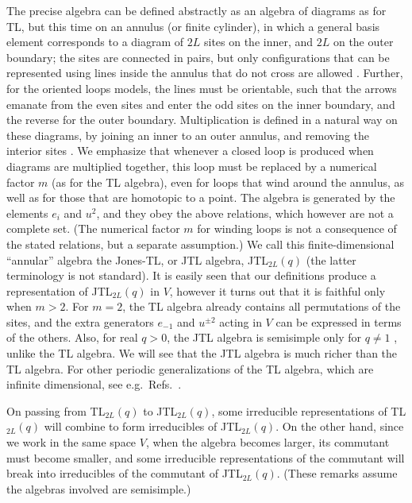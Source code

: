 \documentclass[twocolumn,floats,pra]{revtex4}
\begin{document}
The precise algebra can be defined abstractly as an algebra of
diagrams as for TL, but this time on an annulus (or finite
cylinder), in which a general basis element corresponds to a
diagram of $2L$ sites on the inner, and $2L$ on the outer
boundary; the sites are connected in pairs, but only
configurations that can be represented using lines inside the
annulus that do not cross are allowed \cite{jones2}. Further, for
the oriented loops models, the lines must be orientable, such that
the arrows emanate from the even sites and enter the odd sites on
the inner boundary, and the reverse for the outer boundary.
Multiplication is defined in a natural way on these diagrams, by
joining an inner to an outer annulus, and removing the interior
sites \cite{jones2}. We emphasize that whenever a closed loop is
produced when diagrams are multiplied together, this loop must be
replaced by a numerical factor $m$ (as for the TL algebra), even
for loops that wind around the annulus, as well as for those that
are homotopic to a point. The algebra is generated by the elements
$e_i$ and $u^2$, and they obey the above relations, which however
are not a complete set. (The numerical factor $m$ for winding
loops is not a consequence of the stated relations, but a separate
assumption.) We call this finite-dimensional ``annular'' algebra
\cite{jones2} the Jones-TL, or JTL algebra, JTL$_{2L}(q)$
\cite{jones2,eg} (the latter terminology is not standard). It is
easily seen that our definitions produce a representation of
JTL$_{2L}(q)$ in $V$, however it turns out that it is faithful
only when $m>2$. For $m=2$, the TL algebra already contains all
permutations of the sites, and the extra generators $e_{-1}$ and
$u^{\pm 2}$ acting in $V$ can be expressed in terms of the others.
Also, for real $q>0$, the JTL algebra is semisimple only for
$q\neq 1$ \cite{jones2}, unlike the TL algebra. We will see that
the JTL algebra is much richer than the TL algebra. For other
periodic generalizations of the TL algebra, which are infinite
dimensional, see e.g.\ Refs.\ \cite{ms1,ms2}.

On passing from TL$_{2L}(q)$ to JTL$_{2L}(q)$, some irreducible
representations of TL$_{2L}(q)$ will combine to form irreducibles
of JTL$_{2L}(q)$. On the other hand, since we work in the same
space $V$, when the algebra becomes larger, its commutant must
become smaller, and some irreducible representations of the
commutant will break into irreducibles of the commutant of
JTL$_{2L}(q)$. (These remarks assume the algebras involved are
semisimple.)
\end{document}
